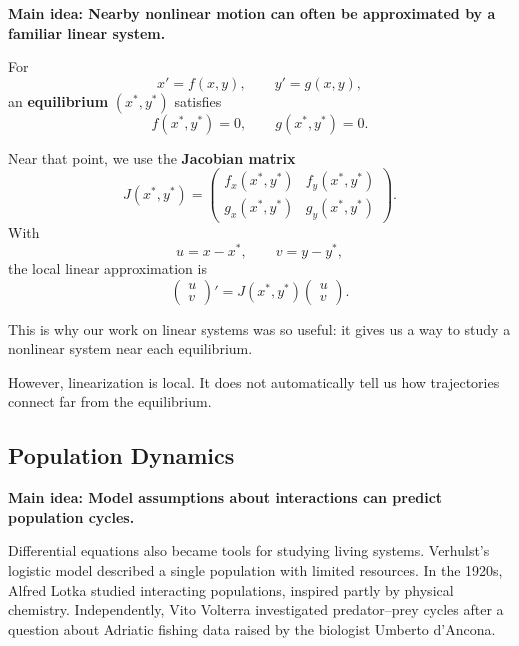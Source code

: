 \documentclass[11pt,letterpaper]{article}
\begin{document}
\textbf{Main idea: Nearby nonlinear motion can often be approximated by a familiar linear system.}

For
\[
x'=f(x,y),\qquad y'=g(x,y),
\]
an \textbf{equilibrium} $(x^*,y^*)$ satisfies
\[
f(x^*,y^*)=0,\qquad g(x^*,y^*)=0.
\]

Near that point, we use the \textbf{Jacobian matrix}
\[
J(x^*,y^*)=
\begin{pmatrix}
f_x(x^*,y^*)&f_y(x^*,y^*)\\
g_x(x^*,y^*)&g_y(x^*,y^*)
\end{pmatrix}.
\]
With
\[
u=x-x^*,\qquad v=y-y^*,
\]
the local linear approximation is
\[
\begin{pmatrix}u\\v\end{pmatrix}'
=
J(x^*,y^*)
\begin{pmatrix}u\\v\end{pmatrix}.
\]

This is why our work on linear systems was so useful:
it gives us a way to study a nonlinear system
near each equilibrium.

However, linearization is local. It does not
automatically tell us how trajectories connect
far from the equilibrium.


\subsection{Population Dynamics}

\textbf{Main idea: Model assumptions about interactions can predict population cycles.}

Differential equations also became tools for studying
living systems. Verhulst's logistic model described
a single population with limited resources.
In the 1920s, Alfred Lotka studied interacting
populations, inspired partly by physical chemistry.
Independently, Vito Volterra investigated predator--prey
cycles after a question about Adriatic fishing data
raised by the biologist Umberto d'Ancona.

\end{document}
